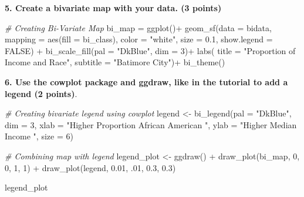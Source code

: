 \documentclass[
]{article}
\newenvironment{Shaded}{\begin{snugshade}}{\end{snugshade}}
\newcommand{\AttributeTok}[1]{\textcolor[rgb]{0.77,0.63,0.00}{#1}}
\newcommand{\CommentTok}[1]{\textcolor[rgb]{0.56,0.35,0.01}{\textit{#1}}}
\newcommand{\ConstantTok}[1]{\textcolor[rgb]{0.00,0.00,0.00}{#1}}
\newcommand{\DecValTok}[1]{\textcolor[rgb]{0.00,0.00,0.81}{#1}}
\newcommand{\FloatTok}[1]{\textcolor[rgb]{0.00,0.00,0.81}{#1}}
\newcommand{\FunctionTok}[1]{\textcolor[rgb]{0.00,0.00,0.00}{#1}}
\newcommand{\NormalTok}[1]{#1}
\newcommand{\OtherTok}[1]{\textcolor[rgb]{0.56,0.35,0.01}{#1}}
\newcommand{\SpecialCharTok}[1]{\textcolor[rgb]{0.00,0.00,0.00}{#1}}
\newcommand{\StringTok}[1]{\textcolor[rgb]{0.31,0.60,0.02}{#1}}
\begin{document}
\textbf{5. Create a bivariate map with your data. (3 points)}

\begin{Shaded}
\begin{Highlighting}[]
\CommentTok{\# Creating Bi{-}Variate Map}
\NormalTok{bi\_map }\OtherTok{=}
  \FunctionTok{ggplot}\NormalTok{()}\SpecialCharTok{+}
  \FunctionTok{geom\_sf}\NormalTok{(}\AttributeTok{data =}\NormalTok{ bidata, }\AttributeTok{mapping =} \FunctionTok{aes}\NormalTok{(}\AttributeTok{fill =}\NormalTok{ bi\_class), }\AttributeTok{color =} \StringTok{"white"}\NormalTok{, }\AttributeTok{size =} \FloatTok{0.1}\NormalTok{, }\AttributeTok{show.legend =} \ConstantTok{FALSE}\NormalTok{) }\SpecialCharTok{+}
  \FunctionTok{bi\_scale\_fill}\NormalTok{(}\AttributeTok{pal =} \StringTok{"DkBlue"}\NormalTok{, }\AttributeTok{dim =} \DecValTok{3}\NormalTok{)}\SpecialCharTok{+}
  \FunctionTok{labs}\NormalTok{(}
    \AttributeTok{title =} \StringTok{"Proportion of Income and Race"}\NormalTok{, }
    \AttributeTok{subtitle =} \StringTok{"Batimore City"}\NormalTok{)}\SpecialCharTok{+}
  \FunctionTok{bi\_theme}\NormalTok{()}
\end{Highlighting}
\end{Shaded}

\textbf{6. Use the cowplot package and ggdraw, like in the tutorial to
add a legend (2 points)}.

\begin{Shaded}
\begin{Highlighting}[]
\CommentTok{\# Creating bivariate legend using cowplot}
\NormalTok{legend }\OtherTok{\textless{}{-}} \FunctionTok{bi\_legend}\NormalTok{(}\AttributeTok{pal =} \StringTok{"DkBlue"}\NormalTok{,}
                    \AttributeTok{dim =} \DecValTok{3}\NormalTok{,}
                    \AttributeTok{xlab =} \StringTok{"Higher Proportion African American "}\NormalTok{,}
                    \AttributeTok{ylab =} \StringTok{"Higher Median Income "}\NormalTok{,}
                    \AttributeTok{size =} \DecValTok{6}\NormalTok{)}

\CommentTok{\# Combining map with legend}
\NormalTok{legend\_plot }\OtherTok{\textless{}{-}} \FunctionTok{ggdraw}\NormalTok{() }\SpecialCharTok{+}
  \FunctionTok{draw\_plot}\NormalTok{(bi\_map, }\DecValTok{0}\NormalTok{, }\DecValTok{0}\NormalTok{, }\DecValTok{1}\NormalTok{, }\DecValTok{1}\NormalTok{) }\SpecialCharTok{+}
  \FunctionTok{draw\_plot}\NormalTok{(legend, }\FloatTok{0.01}\NormalTok{, .}\DecValTok{01}\NormalTok{, }\FloatTok{0.3}\NormalTok{, }\FloatTok{0.3}\NormalTok{)}

\NormalTok{legend\_plot}
\end{Highlighting}
\end{Shaded}
\end{document}
